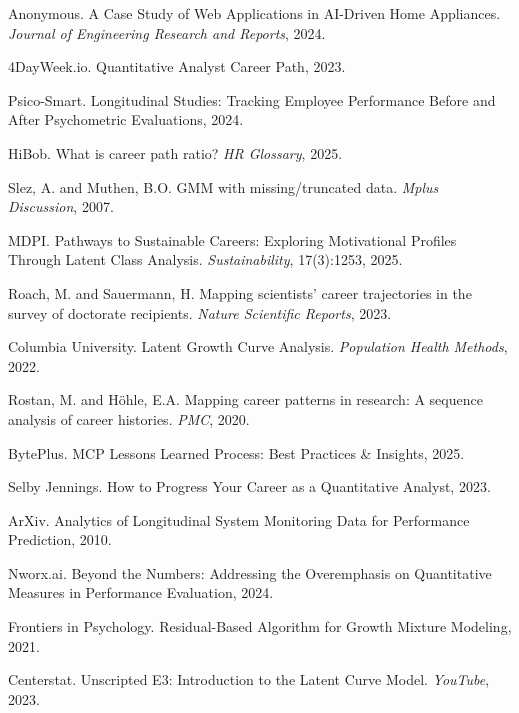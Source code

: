 \documentclass[main.tex]{subfiles}
\begin{document}

\begin{thebibliography}{20}

Anonymous. A Case Study of Web Applications in AI-Driven Home Appliances. \textit{Journal of Engineering Research and Reports}, 2024.

4DayWeek.io. Quantitative Analyst Career Path, 2023.

Psico-Smart. Longitudinal Studies: Tracking Employee Performance Before and After Psychometric Evaluations, 2024.

HiBob. What is career path ratio? \textit{HR Glossary}, 2025.

Slez, A. and Muthen, B.O. GMM with missing/truncated data. \textit{Mplus Discussion}, 2007.

MDPI. Pathways to Sustainable Careers: Exploring Motivational Profiles Through Latent Class Analysis. \textit{Sustainability}, 17(3):1253, 2025.

Roach, M. and Sauermann, H. Mapping scientists' career trajectories in the survey of doctorate recipients. \textit{Nature Scientific Reports}, 2023.

Columbia University. Latent Growth Curve Analysis. \textit{Population Health Methods}, 2022.

Rostan, M. and Höhle, E.A. Mapping career patterns in research: A sequence analysis of career histories. \textit{PMC}, 2020.

BytePlus. MCP Lessons Learned Process: Best Practices \& Insights, 2025.

Selby Jennings. How to Progress Your Career as a Quantitative Analyst, 2023.

ArXiv. Analytics of Longitudinal System Monitoring Data for Performance Prediction, 2010.

Nworx.ai. Beyond the Numbers: Addressing the Overemphasis on Quantitative Measures in Performance Evaluation, 2024.

Frontiers in Psychology. Residual-Based Algorithm for Growth Mixture Modeling, 2021.

Centerstat. Unscripted E3: Introduction to the Latent Curve Model. \textit{YouTube}, 2023.


\end{thebibliography}
\end{document}

